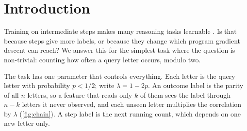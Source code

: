 \begin{abstract}
A Transformer can contain an exact program for counting the letters of a prompt, both one that writes only the
final count and one that writes every running count. Do intermediate steps help because they add labels, or because
they change which program gradient training reaches? We answer this for counting with $n$ hidden updates, where each
letter is the query with probability $p<1/2$ and $\lambda=1-2p$. The mechanism is simple: a feature that reads $k$
letters sees the final count only through a factor $\lambda^{n-k}$, while a displayed running count leaves a local
signal of variance $1-\lambda^2$. We prove two separations.
(1)~\emph{In time:} from the same small seed of a two-block Transformer, step training gives every transition a
positive margin in time polynomial in $n$, while outcome training stays near chance for time $\lambda^{-n}$.
(2)~\emph{Not from capacity:} in a model family that contains exact executors for both formats, from every seed in an
explicit open set, step training reaches positive margins on every transition, while outcome training converges to a
suboptimal minimum with accuracy $(1+\lambda^{n-1})/2$.
Experiments confirm the $\lambda^{-n}$ plateau and the trap, and show that the advantage survives matched label budgets
and learned attention routing.
\end{abstract}

\section{Introduction}
\label{sec:intro}

Training on intermediate steps makes many reasoning tasks learnable
\citep{nye2021scratchpads,wei2022cot,lightman2023verify}. Is that because steps give more labels, or because they
change which program gradient descent can reach? We answer this for the simplest task where the question is
non-trivial: counting how often a query letter occurs, modulo two.

The task has one parameter that controls everything. Each letter is the query letter with probability $p<1/2$; write
$\lambda=1-2p$. An outcome label is the parity of all $n$ letters, so a feature that reads only $k$ of them sees the
label through $n-k$ letters it never observed, and each unseen letter multiplies the correlation by $\lambda$
(\cref{fig:chain}). A step label is the next running count, which depends on one new letter only.

